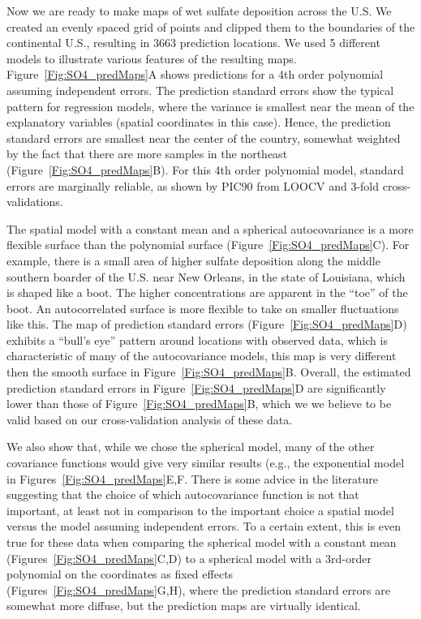 \documentclass[12pt, titlepage]{article}
\begin{document}
Now we are ready to make maps of wet sulfate deposition across the U.S.  We created an evenly spaced grid of points and clipped them to the boundaries of the continental U.S., resulting in 3663 prediction locations.  We used 5 different models to illustrate various features of the resulting maps. Figure~\ref{Fig:SO4_predMaps}A shows predictions for a 4th order polynomial assuming independent errors. The prediction standard errors show the typical pattern for regression models, where the variance is smallest near the mean of the explanatory variables (spatial coordinates in this case).  Hence, the prediction standard errors are smallest near the center of the country, somewhat weighted by the fact that there are more samples in the northeast (Figure~\ref{Fig:SO4_predMaps}B). For this 4th order polynomial model, standard errors are marginally reliable, as shown by PIC90 from LOOCV and 3-fold cross-validations. 

The spatial model with a constant mean and a spherical autocovariance is a more flexible surface than the polynomial surface (Figure~\ref{Fig:SO4_predMaps}C).  For example, there is a small area of higher sulfate deposition along the middle southern boarder of the U.S. near New Orleans, in the state of Louisiana, which is shaped like a boot. The higher concentrations are apparent in the ``toe'' of the boot.  An autocorrelated surface is more flexible to take on smaller fluctuations like this.  The map of prediction standard errors (Figure~\ref{Fig:SO4_predMaps}D) exhibits a ``bull's eye'' pattern around locations with observed data, which is characteristic of many of the autocovariance models, this map is very different then the smooth surface in Figure~\ref{Fig:SO4_predMaps}B.  Overall, the estimated prediction standard errors in Figure~\ref{Fig:SO4_predMaps}D are significantly lower than those of Figure~\ref{Fig:SO4_predMaps}B, which we we believe to be valid based on our cross-validation analysis of these data. 

We also show that, while we chose the spherical model, many of the other covariance functions would give very similar results (e.g., the exponential model in Figures~\ref{Fig:SO4_predMaps}E,F. There is some advice in the literature suggesting that the choice of which autocovariance function is not that important, at least not in comparison to the important choice a spatial model versus the model assuming independent errors.  To a certain extent, this is even true for these data when comparing the spherical model with a constant mean (Figures~\ref{Fig:SO4_predMaps}C,D) to a spherical model with a 3rd-order polynomial on the coordinates as fixed effects (Figures~\ref{Fig:SO4_predMaps}G,H), where the prediction standard errors are somewhat more diffuse, but the prediction maps are virtually identical.
\end{document}
